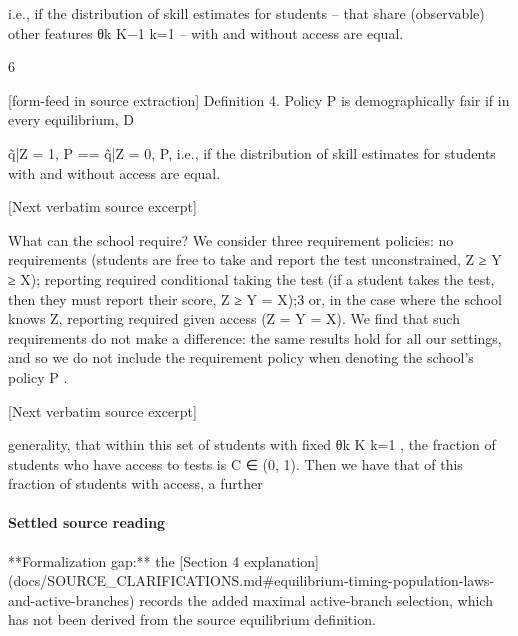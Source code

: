 \documentclass[10pt]{article}
\begin{document}
\begin{ReviewVerbatim}
i.e., if the distribution of skill estimates for students – that share (observable) other features {θk }K−1
k=1
– with and without access are equal.

6


[form-feed in source extraction]
Definition 4. Policy P is demographically fair if in every equilibrium,
D

q̃|Z = 1, P == q̃|Z = 0, P,
i.e., if the distribution of skill estimates for students with and without access are equal.

[Next verbatim source excerpt]

What can the school require? We consider three requirement policies: no requirements (students
are free to take and report the test unconstrained, Z ≥ Y ≥ X); reporting required conditional
taking the test (if a student takes the test, then they must report their score, Z ≥ Y = X);3 or, in
the case where the school knows Z, reporting required given access (Z = Y = X). We ﬁnd that
such requirements do not make a diﬀerence: the same results hold for all our settings, and so we do
not include the requirement policy when denoting the school’s policy P .

[Next verbatim source excerpt]

generality, that within this set of students with ﬁxed {θk }K
k=1 , the fraction of students who have
access to tests is C ∈ (0, 1). Then we have that of this fraction of students with access, a further
\end{ReviewVerbatim}

\paragraph{Settled source reading}
\begin{sloppypar}
**Formalization gap:\allowbreak{}** the [Section 4 explanation](docs/\allowbreak{}SOURCE\_\allowbreak{}CLARIFICATIONS.\allowbreak{}md\#equilibrium-\allowbreak{}timing-\allowbreak{}population-\allowbreak{}laws-\allowbreak{}and-\allowbreak{}active-\allowbreak{}branches) records the added maximal active-\allowbreak{}branch selection, which has not been derived from the source equilibrium definition.\allowbreak{}
\end{sloppypar}
\end{document}
